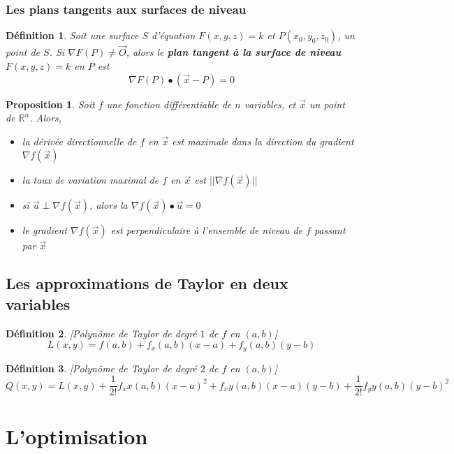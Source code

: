 \documentclass{article}[babel]
\newtheorem{mydef}{Définition}
\newtheorem{myprop}{Proposition}
\begin{document}
		\subsubsection*{Les plans tangents aux surfaces de niveau}
			\begin{mydef}
				Soit une surface $S$ d'équation $F(x,y,z)=k$ et $P(x_0,y_0,z_0)$, un point de $S$. Si $\nabla F(P)\neq\vec{O}$, alors le \textbf{plan tangent à la surface de niveau} $F(x,y,z)=k$ en $P$ est \[\nabla F(P) \bullet (\vec{x}-P)=0\]
			\end{mydef}
			\begin{myprop}
				Soit $f$ une fonction différentiable de $n$ variables, et $\vec{x}$ un point de $\mathbb{R}^n$. Alors,
				\begin{itemize}
					\item la dérivée directionnelle de $f$ en $\vec{x}$ est maximale dans la direction du gradient $\nabla f(\vec{x})$
					\item la taux de variation maximal de $f$ en $\vec{x}$ est $||\nabla f(\vec{x})||$
					\item si $\vec{u}\perp \nabla f(\vec{x})$, alors la $ \nabla f(\vec{x})\bullet\vec{u}=0$
					\item le gradient $\nabla f(\vec{x})$ est perpendiculaire à l'ensemble de niveau de $f$ passant par $\vec{x}$
				\end{itemize}
			\end{myprop}
	\subsection{Les approximations de Taylor en deux variables}
		\begin{mydef}[Polynôme de Taylor de degré $1$ de $f$ en $(a,b)$]
			\[L(x,y)=f(a,b)+f_x(a,b)(x-a)+f_y(a,b)(y-b)\]
		\end{mydef}
		\begin{mydef}[Polynôme de Taylor de degré $2$ de $f$ en $(a,b)$]
			\[Q(x,y)=L(x,y) +\frac{1}{2!}f_xx(a,b)(x-a)^2+f_xy(a,b)(x-a)(y-b)+\frac{1}{2!}f_yy(a,b)(y-b)^2\]
		\end{mydef}
\section{L'optimisation}
\end{document}
